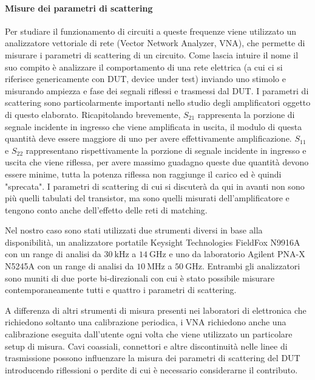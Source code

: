 \documentclass[12pt,oneside]{book}
\begin{document}
\paragraph{Misure dei parametri di scattering} 
Per studiare il funzionamento di circuiti a queste frequenze viene utilizzato un analizzatore vettoriale di rete (Vector Network Analyzer, VNA), che permette di misurare i parametri di scattering di un circuito. Come lascia intuire il nome il suo compito è analizzare il comportamento di una rete elettrica (a cui ci si riferisce genericamente con DUT, device under test) inviando uno stimolo e misurando ampiezza e fase dei segnali riflessi e trasmessi dal DUT. I parametri di scattering sono particolarmente importanti nello studio degli amplificatori oggetto di questo elaborato. Ricapitolando brevemente, $S_{21}$ rappresenta la porzione di segnale incidente in ingresso che viene amplificata in uscita, il modulo di questa quantità deve essere maggiore di uno per avere effettivamente amplificazione. $S_{11}$ e $S_{22}$ rappresentano rispettivamente la porzione di segnale incidente in ingresso e uscita che viene riflessa, per avere massimo guadagno queste due quantità devono essere minime, tutta la potenza riflessa non raggiunge il carico ed è quindi "sprecata". I parametri di scattering di cui si discuterà da qui in avanti non sono più quelli tabulati del transistor, ma sono quelli misurati dell'amplificatore e tengono conto anche dell'effetto delle reti di matching.

Nel nostro caso sono stati utilizzati due strumenti diversi in base alla disponibilità, un analizzatore portatile Keysight Technologies FieldFox N9916A con un range di analisi da $\SI{30}{\kilo\hertz}$ a $\SI{14}{\giga\hertz}$ e uno da laboratorio Agilent PNA-X N5245A con un range di analisi da $\SI{10}{\mega\hertz}$ a $\SI{50}{\giga\hertz}$. Entrambi gli analizzatori sono muniti di due porte bi-direzionali con cui è stato possibile misurare contemporaneamente tutti e quattro i parametri di scattering.

A differenza di altri strumenti di misura presenti nei laboratori di elettronica che richiedono soltanto una calibrazione periodica, i VNA richiedono anche una calibrazione eseguita dall'utente ogni volta che viene utilizzato un particolare setup di misura. Cavi coassiali, connettori e altre discontinuità nelle linee di trasmissione possono influenzare la misura dei parametri di scattering del DUT introducendo riflessioni o perdite di cui è necessario considerarne il contributo.
\end{document}
